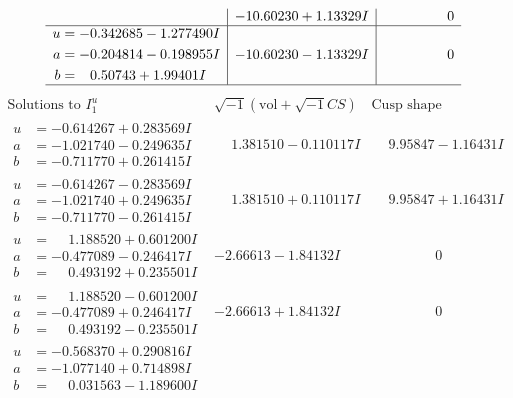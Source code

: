 \documentclass[1p]{elsarticle_modified}
\theoremstyle{definition}
\newcommand{\I}{\sqrt{-1}}
\begin{document}
$$\begin{array}{c|c|c}
 & -10.60230 + 1.13329 I & \phantom{-0.000000 } 0 \\ \hline\begin{aligned}
u &= -0.342685 - 1.277490 I \\
a &= -0.204814 - 0.198955 I \\
b &= \phantom{-}0.50743 + 1.99401 I\end{aligned}
 & -10.60230 - 1.13329 I & \phantom{-0.000000 } 0\\
 \hline 
 \end{array}$$\newpage$$\begin{array}{c|c|c}  
\text{Solutions to }I^u_{1}& \I (\text{vol} + \sqrt{-1}CS) & \text{Cusp shape}\\
 \hline 
\begin{aligned}
u &= -0.614267 + 0.283569 I \\
a &= -1.021740 - 0.249635 I \\
b &= -0.711770 + 0.261415 I\end{aligned}
 & \phantom{-}1.381510 - 0.110117 I & \phantom{-}9.95847 - 1.16431 I \\ \hline\begin{aligned}
u &= -0.614267 - 0.283569 I \\
a &= -1.021740 + 0.249635 I \\
b &= -0.711770 - 0.261415 I\end{aligned}
 & \phantom{-}1.381510 + 0.110117 I & \phantom{-}9.95847 + 1.16431 I \\ \hline\begin{aligned}
u &= \phantom{-}1.188520 + 0.601200 I \\
a &= -0.477089 - 0.246417 I \\
b &= \phantom{-}0.493192 + 0.235501 I\end{aligned}
 & -2.66613 - 1.84132 I & \phantom{-0.000000 } 0 \\ \hline\begin{aligned}
u &= \phantom{-}1.188520 - 0.601200 I \\
a &= -0.477089 + 0.246417 I \\
b &= \phantom{-}0.493192 - 0.235501 I\end{aligned}
 & -2.66613 + 1.84132 I & \phantom{-0.000000 } 0 \\ \hline\begin{aligned}
u &= -0.568370 + 0.290816 I \\
a &= -1.077140 + 0.714898 I \\
b &= \phantom{-}0.031563 - 1.189600 I\end{aligned}

\end{array}$$
\end{document}
